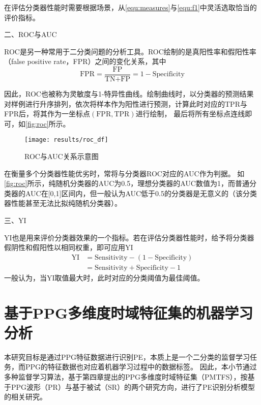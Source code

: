 在评估分类器性能时需要根据场景，从\autoref{equ:measures}与\autoref{equ:f1}中灵活选取恰当的评价指标。

二、ROC与AUC

ROC是另一种常用于二分类问题的分析工具。ROC绘制的是真阳性率和假阳性率（false positive rate，FPR）之间的变化关系，其中
\begin{equation}
    \label{equ:fpr}
    \text{FPR}=\frac{\text{FP}}{\text{TN+FP}}=1-\text{Specificity}
\end{equation}

因此，ROC也被称为灵敏度与1-特异性曲线。绘制曲线时，以分类器的预测结果对样例进行升序排列，依次将样本作为阳性进行预测，计算此时对应的TPR与FPR后，将其作为一坐标点$(\text{FPR},\text{TPR})$进行绘制，
最后将所有坐标点连线即可，如\autoref{fig:roc}所示。
\begin{figure}[htbp]
    \centering
    \texttt{[image: results/roc\_df]}
    \caption[ROC曲线与AUC关系示意图]{\label{fig:roc}ROC与AUC关系示意图}
\end{figure}

在衡量多个分类器性能优劣时，常将与分类器ROC对应的AUC作为判据。
如\autoref{fig:roc}所示，纯随机分类器的AUC为0.5，理想分类器的AUC数值为1，而普通分类器的AUC在[0,1]区间内，但一般认为AUC低于0.5的分类器是无意义的（该分类器性能甚至无法比拟纯随机分类器）\cite{Aurélien2018}。

三、YI

YI也是用来评价分类器效果的一个指标。若在评估分类器性能时，给予将分类器假阴性和假阳性以相同权重，即可应用YI
\begin{equation}
    \label{equ:yi}
    \begin{aligned}
        \text{YI}&=\text{Sensitivity}-(1-\text{Specificity})\\
        &=\text{Sensitivity}+\text{Specificity}-1
    \end{aligned}
\end{equation}
一般认为，当YI取值最大时，此时对应的分类阈值为最佳阈值\cite{cwl}。

\section{基于PPG多维度时域特征集的机器学习分析}
本研究目标是通过PPG特征数据进行识别PE，本质上是一个二分类的监督学习任务，而PPG的特征数据也对应着机器学习过程中的数据标签。
因此，本小节通过多种监督学习算法，基于第四章提出的PPG多维度时域特征集（PMTFS），按基于PPG波形（PR）与基于被试（SR）的两个研究方向，进行了PE识别分析模型的相关研究。

